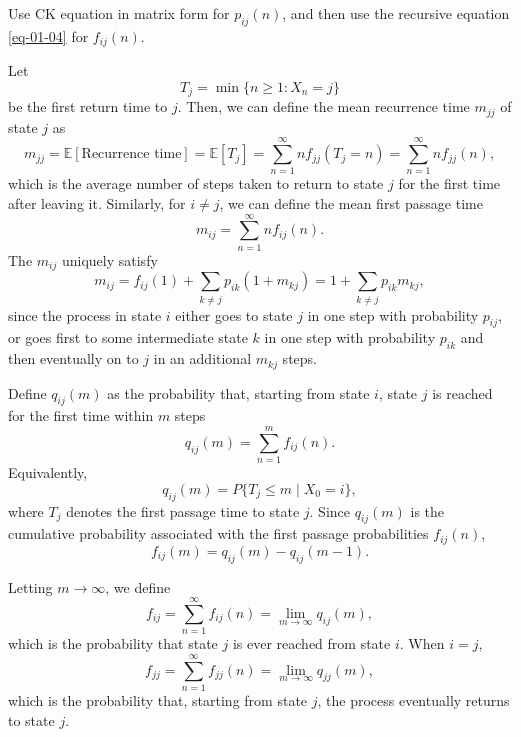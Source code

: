 \documentclass[../Note.tex]{subfiles}
\begin{document}
\begin{remark}
    Use CK equation in matrix form for $p_{ij}(n)$, and then use the recursive equation \eqref{eq-01-04} for $f_{ij}(n)$.
\end{remark}

Let 
\[
    T_j = \min\{n \geq 1: X_n = j\}
\]
be the first return time to $j$. Then, we can define the mean recurrence time $m_{jj}$ of state $j$ as 
\[
    m_{jj} = \mathbb{E}[\text{Recurrence time}] = \mathbb{E}[T_j] = \sum_{n = 1}^{\infty} n f_{jj}(T_j = n) = \sum_{n = 1}^{\infty} n f_{jj}(n),
\]
which is the average number of steps taken to return to state $j$ for the first time after leaving it. Similarly, for $i \ne j$, we can define the mean first passage time
\[
    m_{ij} = \sum_{n = 1}^{\infty} n f_{ij}(n).
\]
The $m_{ij}$ uniquely satisfy
\[
    m_{ij} = f_{ij}(1) + \sum_{k \ne j} p_{ik} (1 + m_{kj}) = 1 + \sum_{k \ne j}p_{ik}m_{kj},
\]
since the process in state $i$ either goes to state $j$ in one step with probability $p_{ij}$, or goes first to some intermediate state $k$ in one step with probability $p_{ik}$ and then eventually on to $j$ in an additional $m_{kj}$ steps.

Define $q_{ij}(m)$ as the probability that, starting from state $i$, state $j$ is reached for the first time within $m$ steps
\[
    q_{ij}(m) = \sum_{n=1}^{m} f_{ij}(n).
\]
Equivalently,
\[
    q_{ij}(m) = P\{T_j \leq m \mid X_0=i\},
\]
where $T_j$ denotes the first passage time to state $j$. Since $q_{ij}(m)$ is the cumulative probability associated with the first passage probabilities $f_{ij}(n)$,
\[
    f_{ij}(m) = q_{ij}(m)-q_{ij}(m-1).
\]

Letting $m\to\infty$, we define
\[
    f_{ij}=\sum_{n=1}^{\infty} f_{ij}(n)=\lim_{m\to\infty} q_{ij}(m),
\]
which is the probability that state $j$ is ever reached from state $i$. When $i=j$,
\[
    f_{jj}=\sum_{n=1}^{\infty} f_{jj}(n)=\lim_{m\to\infty}q_{jj}(m),
\]
which is the probability that, starting from state $j$, the process eventually returns to state $j$.
\end{document}
